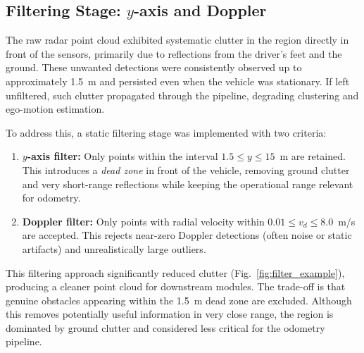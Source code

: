 \vspace{0.5em}
\subsection{Filtering Stage: $y$-axis and Doppler}

The raw radar point cloud exhibited systematic clutter in the region directly in front of the sensors, primarily due to reflections from the driver's feet and the ground.  
These unwanted detections were consistently observed up to approximately \SI{1.5}{\meter} and persisted even when the vehicle was stationary.  
If left unfiltered, such clutter propagated through the pipeline, degrading clustering and ego-motion estimation.  

To address this, a static filtering stage was implemented with two criteria:
\begin{enumerate}
    \item \textbf{$y$-axis filter:} Only points within the interval $1.5 \leq y \leq 15$~m are retained.  
    This introduces a \textit{dead zone} in front of the vehicle, removing ground clutter and very short-range reflections while keeping the operational range relevant for odometry.
    \item \textbf{Doppler filter:} Only points with radial velocity within $0.01 \leq v_d \leq 8.0$~m/s are accepted.  
    This rejects near-zero Doppler detections (often noise or static artifacts) and unrealistically large outliers.
\end{enumerate}

\noindent
This filtering approach significantly reduced clutter (Fig.~\ref{fig:filter_example}), producing a cleaner point cloud for downstream modules.  
The trade-off is that genuine obstacles appearing within the \SI{1.5}{\meter} dead zone are excluded.  
Although this removes potentially useful information in very close range, the region is dominated by ground clutter and considered less critical for the odometry pipeline.  

